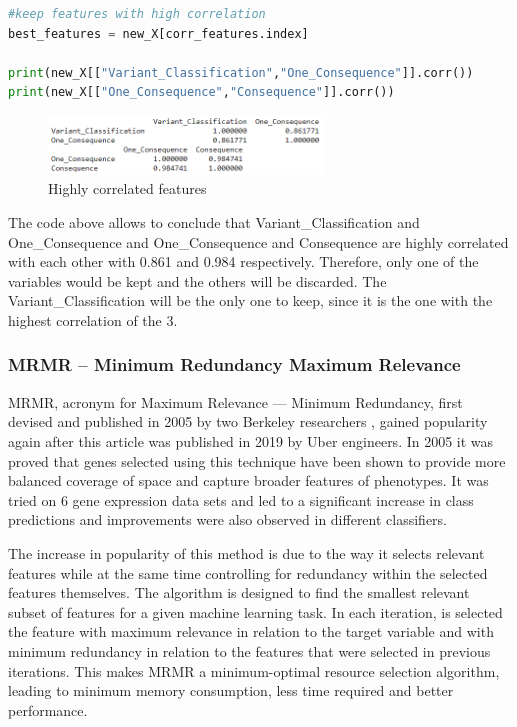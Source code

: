 \begin{lstlisting}[language=Python]
#keep features with high correlation
best_features = new_X[corr_features.index]

print(new_X[["Variant_Classification","One_Consequence"]].corr())
print(new_X[["One_Consequence","Consequence"]].corr())

\end{lstlisting}


\begin{figure}[h]
    \centering
    \includegraphics[width=0.65\textwidth,height=0.1\textheight]{Chapters/Figures/cfs_1.png}
    \caption{Highly correlated features}
    \label{fig:lda_graph}
\end{figure}

The code above allows to conclude that Variant\_Classification and One\_Consequence and One\_Consequence and Consequence are highly correlated with each other with 0.861 and 0.984 respectively. Therefore, only one of the variables would be kept and the others will be discarded. The Variant\_Classification will be the only one to keep, since it is the one with the highest correlation of the 3.


\subsubsection{MRMR – Minimum Redundancy Maximum Relevance}
\label{sec:inserting_tables}
\hspace{10px} MRMR, acronym for Maximum Relevance — Minimum Redundancy, first devised and published in 2005 by two Berkeley researchers \cite{Ding}, gained popularity again after this \cite{Zhenyu} article was published in 2019 by Uber engineers. In 2005 it was proved that genes selected using this technique have been shown to provide more balanced coverage of space and capture broader features of phenotypes. It was tried on 6 gene expression data sets and led to a significant increase in class predictions and improvements were also observed in different classifiers.

The increase in popularity of this method is due to the way it selects relevant features while at the same time controlling for redundancy within the selected features themselves. The algorithm is designed to find the smallest relevant subset of features for a given machine learning task. In each iteration, is selected the feature with maximum relevance in relation to the target variable and with minimum redundancy in relation to the features that were selected in previous iterations. This makes MRMR a minimum-optimal resource selection algorithm, leading to minimum memory consumption, less time required and better performance.

